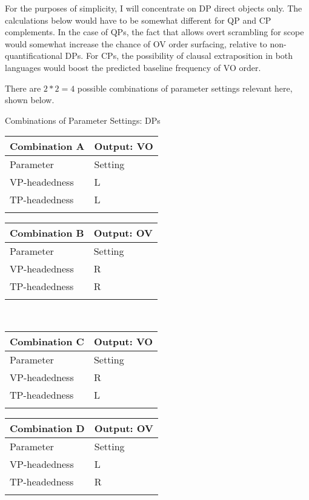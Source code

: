 \documentclass[output=paper]{langsci/langscibook}
\begin{document}
For the purposes of simplicity, I will concentrate on DP direct objects only.
The calculations below would have to be somewhat different for QP and CP
complements.  In the case of QPs, the fact that  allows overt scrambling
for scope would somewhat increase the chance of OV order surfacing, relative to
non-quantificational DPs.  For CPs, the possibility of clausal extraposition in
both languages would boost the predicted baseline frequency of VO order.

There are $2*2=4$ possible combinations of parameter settings relevant here,
shown below.

\ea\label{bkm:Ref341539124}Combinations of Parameter Settings: DPs
    \begin{tabularx}{.4\textwidth}{ll}
    \lsptoprule
    Combination A & Output: VO\\
    \midrule
    Parameter     & Setting\\
    VP-headedness & L\\
    TP-headedness & L\\
    \lspbottomrule
    \end{tabularx}
    \quad
    \begin{tabularx}{.4\textwidth}{ll}
    \lsptoprule
    Combination B & Output: OV\\
    \midrule
    Parameter     & Setting\\
    VP-headedness & R\\
    TP-headedness & R\\
    \lspbottomrule
    \end{tabularx}\\
    \begin{tabularx}{.4\textwidth}{ll}
    \lsptoprule
    Combination C & Output: VO\\
    \midrule
    Parameter     & Setting\\
    VP-headedness & R\\
    TP-headedness & L\\
    \lspbottomrule
    \end{tabularx}
    \quad
    \begin{tabularx}{.4\textwidth}{ll}
    \lsptoprule
    Combination D & Output: OV\\
    \midrule
    Parameter     & Setting\\
    VP-headedness & L\\
    TP-headedness & R\\
    \lspbottomrule
    \end{tabularx}
\z
\end{document}
